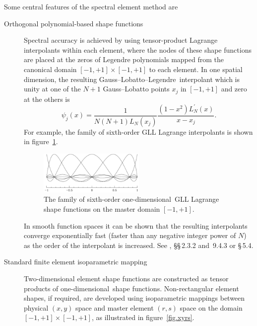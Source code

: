 \documentclass[11pt]{report}
\newcommand\oned{one-di\-men\-sion\-al}
\newcommand\GLL{Gauss--Lobatto--Legendre}
\begin{document}
Some central features of the spectral element method are
\begin{description}
\item[Orthogonal polynomial-based shape functions] Spectral accuracy
  is achieved by using tensor-product Lagrange interpolants within
  each element, where the nodes of these shape functions are placed at
  the zeros of Legendre polynomials mapped from the canonical domain
  $[-1,+1]\times[-1,+1]$ to each element.  In one spatial dimension,
  the resulting \GLL\ interpolant which is unity at one of the $N + 1$
  Gauss--Lobatto points $x_j$ in $[-1,+1]$ and zero at the others
  is
\begin{equation}
\psi_j(x) = \frac{1}{N(N+1)L_N(x_j)}\frac{(1-x^2)L_N^\prime(x)}{x - x_j}.
\end{equation}
For example, the family of sixth-order GLL Lagrange interpolants is
shown in figure~\ref{fig:shapes}.
\begin{figure}
\begin{center}
  \includegraphics[width=0.5\textwidth]{shape7x7}
\end{center}
\caption{The family of sixth-order \oned\ GLL Lagrange shape functions
  on the master domain $[-1,+1]$.}
\label{fig:shapes}
\end{figure}
In smooth function spaces it can be shown that the resulting
interpolants converge exponentially fast (faster than any negative
integer power of $N$) as the order of the interpolant is increased.
See \citet{chqz88}, \S\S\,2.3.2 and~9.4.3 or \citet{chqz06} \S\,5.4.
\item[Standard finite element isoparametric mapping] Two-dimensional
  element shape functions are constructed as tensor products of
  \oned\ shape functions.  Non-rectangular element shapes, if
  required, are developed using isoparametric mappings between
  physical $(x,y)$ space and master element $(r,s)$ space on the domain
  $[-1,+1]\times[-1,+1]$, as illustrated in figure~\ref{fig.xyrs}.
\begin{figure}
\begin{center}

\end{center}
\end{figure}
\end{description}
\end{document}
